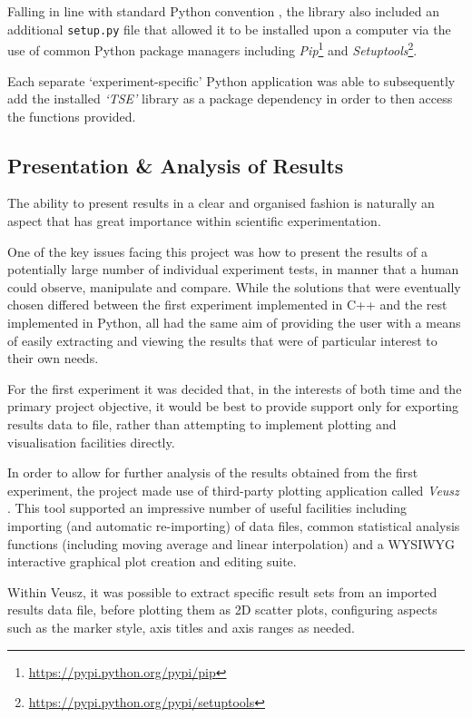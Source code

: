 Falling in line with standard Python convention \cite{setup}, the library also included an additional \texttt{setup.py} file that allowed it to be installed upon a computer via the use of common Python package managers including \textit{Pip}\footnote{\url{https://pypi.python.org/pypi/pip}} and \textit{Setuptools}\footnote{\url{https://pypi.python.org/pypi/setuptools}}.

Each separate `experiment-specific' Python application was able to subsequently add the installed \textit{`TSE'} library as a package dependency in order to then access the functions provided.

\subsection{Presentation \& Analysis of Results}
\label{display}

The ability to present results in a clear and organised fashion is naturally an aspect that has great importance within scientific experimentation. 

One of the key issues facing this project was how to present the results of a potentially large number of individual experiment tests, in manner that a human could observe, manipulate and compare. While the solutions that were eventually chosen differed between the first experiment implemented in C++ and the rest implemented in Python, all had the same aim of providing the user with a means of easily extracting and viewing the results that were of particular interest to their own needs.

For the first experiment it was decided that, in the interests of both time and the primary project objective, it would be best to provide support only for exporting results data to file, rather than attempting to implement plotting and visualisation facilities directly. 

In order to allow for further analysis of the results obtained from the first experiment, the project made use of third-party plotting application called \textit{Veusz} \cite{}. This tool supported an impressive number of useful facilities including importing (and automatic re-importing) of data files, common statistical analysis functions (including moving average and linear interpolation) and a WYSIWYG interactive graphical plot creation and editing suite. 

Within Veusz, it was possible to extract specific result sets from an imported results data file, before plotting them as 2D scatter plots, configuring aspects such as the marker style, axis titles and axis ranges as needed.   


